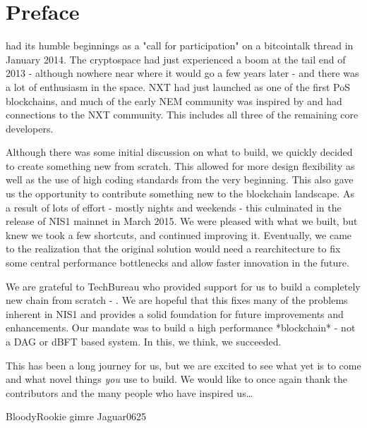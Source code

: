 \section*{Preface}


 had its humble beginnings as a "call for participation" on a bitcointalk thread in January 2014.
The cryptospace had just experienced a boom at the tail end of 2013 - although nowhere near where it would go a few years later - and there was a lot of enthusiasm in the space.
NXT had just launched as one of the first PoS blockchains, and much of the early NEM community was inspired by and had connections to the NXT community. This includes all three of the remaining core developers.

Although there was some initial discussion on what to build, we quickly decided to create something new from scratch.
This allowed for more design flexibility as well as the use of high coding standards from the very beginning.
This also gave us the opportunity to contribute something new to the blockchain landscape.
As a result of lots of effort - mostly nights and weekends - this culminated in the release of NIS1 mainnet in March 2015.
We were pleased with what we built, but knew we took a few shortcuts, and continued improving it.
Eventually, we came to the realization that the original solution would need a rearchitecture to fix some central performance bottlenecks and allow faster innovation in the future.

We are grateful to TechBureau who provided support for us to build a completely new chain from scratch - \codename.
We are hopeful that this fixes many of the problems inherent in NIS1 and provides a solid foundation for future improvements and enhancements.
Our mandate was to build a high performance *blockchain* - not a DAG or dBFT based system.
In this, we think, we succeeded.

This has been a long journey for us, but we are excited to see what yet is to come and what novel things \textit{you} use \codenamespace to build.
We would like to once again thank the contributors and the many people who have inspired us\ldots

\begin{flushright}
BloodyRookie
gimre
Jaguar0625
\end{flushright}
